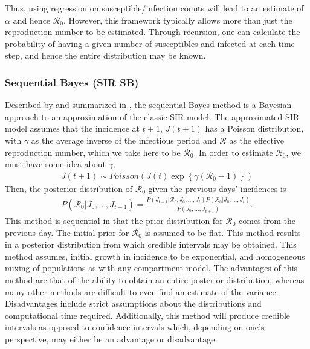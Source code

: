 \documentclass[12pt]{article}
\newcommand{\rr}{\ensuremath{\mathcal{R}_0}}
\begin{document}
Thus, using regression on susceptible/infection counts will lead to an estimate of $\alpha$ and hence $\rr$.  However, this framework typically allows more than just the reproduction number to be estimated.  Through recursion, one can calculate the probability of having a given number of susceptibles and infected at each time step, and hence the entire distribution may be known.





\subsubsection{Sequential Bayes (SIR SB)}\label{sec:seqbayes}

Described by \cite{bettencourt2008} and summarized in \cite{obadia2012r0}, the sequential Bayes method is a Bayesian approach to an approximation of the classic SIR model.  The approximated SIR model assumes that the incidence at $t+1$, $J(t+1)$ has a Poisson distribution, with $\gamma$ as the  average inverse of the infectious period and $\mathcal{R}$ as the effective reproduction number, which we take here to be $\rr$. In order to estimate $\rr$, we must have some idea about $\gamma$,
\begin{align*}
J(t+1)  \sim Poisson( J(t) \exp \left \{  \gamma (\rr-1)\right \})
\end{align*}
Then, the posterior distribution of $\rr$ given the previous days' incidences is
\begin{align*}
  P(\rr | J_0, \dots, J_{t+1}) = \frac{P(J_{t+1} | \rr, J_0, \dots, J_t)P(\rr| J_0, \dots, J_t)}{P(J_0, \dots, J_{t+1})}.
\end{align*}
This method is sequential in that the prior distribution for $\rr$ comes from the previous day.  The initial prior for $\rr$ is assumed to be flat.  This method results in a posterior distribution from which credible intervals may be obtained.  This method assumes, initial growth in incidence to be exponential, and homogeneous mixing of populations as with any compartment model.  The advantages of this method are that of the ability to obtain an entire posterior distribution, whereas many other methods are difficult to even find an estimate of the variance.  Disadvantages include strict assumptions about the distributions and computational time required.  Additionally, this method will produce credible intervals as opposed to confidence intervals which, depending on one's perspective, may either be an advantage or disadvantage.
\end{document}
